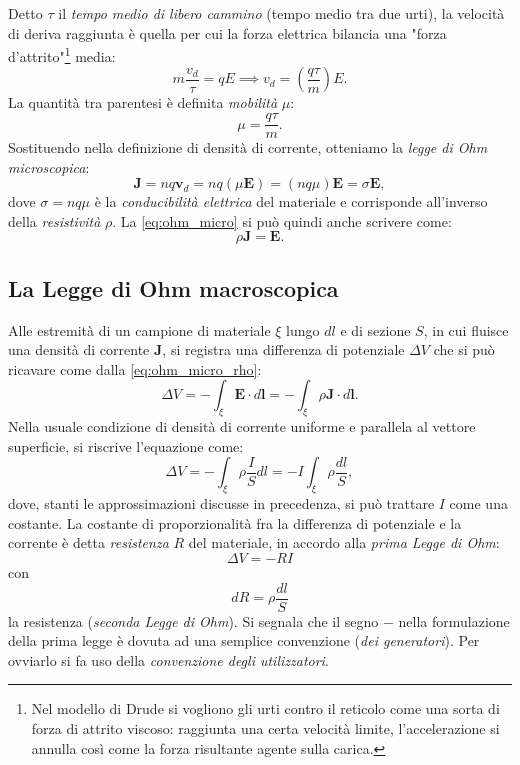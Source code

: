 \documentclass[a4paper,11pt]{report}
\begin{document}
Detto $\tau$ il \textit{tempo medio di libero cammino} (tempo medio tra due urti), la velocità di deriva raggiunta è quella per cui la forza elettrica bilancia una "forza d'attrito"\footnote{Nel modello di Drude si vogliono gli urti contro il reticolo come una sorta di forza di attrito viscoso: raggiunta una certa velocità limite, l'accelerazione si annulla così come la forza risultante agente sulla carica.} media:
\begin{equation}
   m \frac{v_d}{\tau} = qE \implies v_d = \left( \frac{q\tau}{m} \right) E.
\end{equation}
La quantità tra parentesi è definita \textit{mobilità} $\mu$:
\begin{equation}
    \mu = \frac{q\tau}{m}.
\end{equation}
Sostituendo nella definizione di densità di corrente, otteniamo la \textit{legge di Ohm microscopica}:
\begin{equation}
    \bm{J} = nq\bm{v}_d =  nq (\mu \bm{E}) = (nq\mu) \bm{E} = \sigma \bm{E},
    \label{eq:ohm_micro}
\end{equation}
dove $\sigma = nq\mu$ è la \textit{conducibilità elettrica} del materiale e corrisponde all'inverso della \textit{resistività} $\rho$. La \eqref{eq:ohm_micro} si può quindi anche scrivere come:
\begin{equation}
    \rho\bm{J} = \bm{E}.
    \label{eq:ohm_micro_rho}
\end{equation}

\subsection{La Legge di Ohm macroscopica}
Alle estremità di un campione di materiale $\xi$ lungo $dl$ e di sezione $S$, in cui fluisce una densità di corrente $\bm{J}$, si registra una differenza di potenziale $\Delta V$ che si può ricavare come dalla \eqref{eq:ohm_micro_rho}:
\begin{equation}
	\Delta V = -\int_\xi \bm{E} \cdot d\bm{l} = -\int_\xi \rho\bm{J} \cdot d\bm{l}.
\end{equation}
Nella usuale condizione di densità di corrente uniforme e parallela al vettore superficie, si riscrive l'equazione come:
\begin{equation}
	\Delta V = -\int_\xi \rho\frac{I}{S}  d{l} = - I \int_\xi \rho\frac{dl}{S},
\end{equation}
dove, stanti le approssimazioni discusse in precedenza, si può trattare $I$ come una costante. La costante di proporzionalità fra la differenza di potenziale e la corrente è detta \textit{resistenza} $R$ del materiale, in accordo alla \textit{prima Legge di Ohm}:
\begin{equation}
	\Delta V = -RI
\end{equation}
con 
\begin{equation}
dR = \rho\frac{dl}{S}
\end{equation}
la resistenza (\textit{seconda Legge di Ohm}). Si segnala che il segno $-$ nella formulazione della prima legge è dovuta ad una semplice convenzione (\textit{dei generatori}). Per ovviarlo si fa uso della \textit{convenzione degli utilizzatori}.
\end{document}
